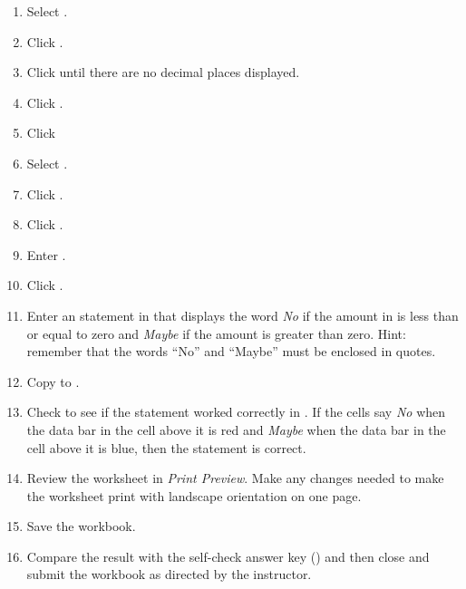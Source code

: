 \begin{enumerate}
	\item Select .
	\item Click .
	\item Click  until there are no decimal places displayed.
	\item Click .
	\item Click  

	\item Select . 
	\item Click .
	
	\item Click . 
	\item Enter . 
	\item Click .
	\item Enter an  statement in that displays the word \textit{No} if the amount in  is less than or equal to zero and \textit{Maybe} if the amount is greater than zero. Hint: remember that the words ``No'' and ``Maybe'' must be enclosed in quotes. 
	\item Copy  to .

	\item Check to see if the  statement worked correctly in . If the cells say \textit{No} when the data bar in the cell above it is red and \textit{Maybe} when the data bar in the cell above it is blue, then the  statement is correct.

	\item Review the worksheet in \textit{Print Preview}. Make any changes needed to make the worksheet print with landscape orientation on one page.
	\item Save the  workbook.
	\item Compare the result with the self-check answer key () and then close and submit the  workbook as directed by the instructor.
\end{enumerate}

